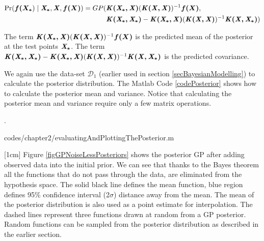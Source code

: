   \begin{equation}\label{eqNoiseFreePosteriorGP}
  \begin{aligned}
  \Pr(\boldsymbol{f(X_{*}}) \mid \bm{\mathit{X_{*}}}, \bm{\mathit{X}}, \boldsymbol{f(X)}) = GP(  & \bm{\mathit{K(X_{*}, X)}}( \bm{\mathit{K(X, X)}} )^{-1}\boldsymbol{f(X)},   \\ 
                                & \bm{\mathit{K(X_{*}, X_{*})}} - \bm{\mathit{K(X_{*}, X)}}( \bm{\mathit{K(X, X)}} )^{-1} \bm{\mathit{K(X, X_{*})}})
  \end{aligned}
  \end{equation}

The term $\bm{\mathit{K(X_{*}, X)}}( \bm{\mathit{K(X, X)}} )^{-1}\boldsymbol{f(X)}$ is the predicted mean of the posterior at the test points $\bm{\mathit{X_{*}}}$. The term $ \bm{\mathit{K(X_{*}, X_{*})}} - \bm{\mathit{K(X_{*}, X)}}( \bm{\mathit{K(X, X)}} )^{-1} \bm{\mathit{K(X, X_{*})}}$ is the predicted covariance. 

We again use the data-set $\mathcal{D}_{1}$ (earlier used in section \ref{secBayesianModelling}) to calculate the posterior distribution. The Matlab Code \ref{codePosterior} shows how to calculate the posterior mean and variance. Notice that calculating the posterior mean and variance require only a few matrix operations. 

.%
\begin{mdframed}[hidealllines=true,backgroundcolor=lightgray!20]

                    {codes/chapter2/evaluatingAndPlottingThePosterior.m}
\end{mdframed}

[1cm]
Figure \ref{figGPNoiseLessPosteriors} shows the posterior GP after adding observed data into the initial prior. We can see that thanks to the Bayes theorem all the functions that do not pass through the data, are eliminated from the hypothesis space. The solid black line defines the mean function, blue region defines 95\% confidence interval (2$\sigma$) distance away from the mean. The mean of the posterior distribution is also used as a point estimate for interpolation. The dashed lines represent three functions drawn at random from a GP posterior. Random functions can be sampled from the posterior distribution as described in the earlier section. 


